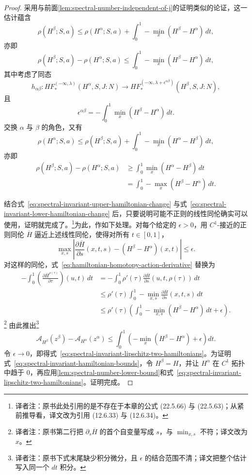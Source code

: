 \begin{proof}
采用与前面\cref{lem:spectral-number-independent-of-j}的证明类似的论证，这一估计蕴含
\[
  \rho(H^\beta;S,a)
  \le\rho(H^\alpha;S,a)
    +\int_0^1-\min_x(H^\beta-H^\alpha)\,dt,
\]
亦即
\begin{equation}
  \rho(H^\beta;S,a)-\rho(H^\alpha;S,a)
  \le\int_0^1-\min_x(H^\beta-H^\alpha)\,dt,
\label{eq:spectral-invariant-upper-hamiltonian-change}
\end{equation}
其中考虑了同态
\[
  h_{\alpha\beta}:
  HF_*^{(-\infty,\lambda)}(H^\alpha,S,J:N)
  \longrightarrow
  HF_*^{(-\infty,\lambda+\epsilon^{\alpha\beta})}(H^\beta,S,J:N),
\]
且
\[
  \epsilon^{\alpha\beta}
  =-\int_0^1\min_x(H^\beta-H^\alpha)\,dt.
\]
交换 $\alpha$ 与 $\beta$ 的角色，又有
\[
  \rho(H^\alpha;S,a)
  \le\rho(H^\beta;S,a)
    +\int_0^1-\min_x(H^\alpha-H^\beta)\,dt,
\]
亦即
\begin{equation}
\begin{split}
  \rho(H^\beta;S,a)-\rho(H^\alpha;S,a)
  &\ge\int_0^1\min_x(H^\alpha-H^\beta)\,dt\\
  &=\int_0^1-\max_x(H^\beta-H^\alpha)\,dt.
\end{split}
\label{eq:spectral-invariant-lower-hamiltonian-change}
\end{equation}

结合式~\eqref{eq:spectral-invariant-upper-hamiltonian-change} 与式~\eqref{eq:spectral-invariant-lower-hamiltonian-change} 后，只要说明可能不正则的线性同伦确实可以使用，证明就完成了。\footnote{译者注：原书此处引用的是不存在于本章的公式 (22.5.66) 与 (22.5.63)；从紧前推导看，译文改为引用 (12.6.33) 与 (12.6.34)。}为此，作如下处理。对每个给定的 $\epsilon>0$，用 $C^1$-接近的正则同伦 $\overline H$ 逼近上述线性同伦，使得对所有 $t\in[0,1]$，
\[
  \max_{x,s}
  \left\lvert
    \frac{\partial\overline H}{\partial s}(x,t,s)
    -(H^\beta-H^\alpha)(x,t)
  \right\rvert
  \le\epsilon.
\]
对这样的同伦，式~\eqref{eq:hamiltonian-homotopy-action-derivative} 替换为
\[
\begin{split}
  -\int_0^1
  \left(\frac{\partial\overline H^{\rho(\tau)}}{\partial\tau}\right)(u,t)\,dt
  &=-\int_0^1\rho'(\tau)
    \frac{\partial\overline H}{\partial s}(u,t,\rho(\tau))\,dt\\
  &\le\rho'(\tau)
    \int_0^1-\min_{x,s}
    \frac{\partial\overline H}{\partial s}(x,t,s)\,dt\\
  &\le\rho'(\tau)
    \left(
      \int_0^1-\min_{x,s}(H^\beta-H^\alpha)\,dt
      +\epsilon
    \right).
\end{split}
\]
\footnote{译者注：原书第二行把 $\partial_s\overline H$ 的首个自变量写成 $s$，与 $\min_{x,s}$ 不符；译文改为 $x$。}
由此推出\footnote{译者注：原书下式末尾缺少积分微分，且 $\epsilon$ 的结合范围不清；译文把整个估计写入同一个 $dt$ 积分。}
\[
  \mathcal A_{H^\beta}(z^\beta)-\mathcal A_{H^\alpha}(z^\alpha)
  \le\int_0^1
  \left(-\min_x(H^\beta-H^\alpha)+\epsilon\right)dt.
\]
令 $\epsilon\to0$，即得式~\eqref{eq:spectral-invariant-lipschitz-two-hamiltonians}。为证明式~\eqref{eq:spectral-invariant-hamiltonian-bounds}，令 $H^\beta=H$，并让 $H^\alpha$ 在 $C^1$ 拓扑中趋于 0，再应用\cref{lem:spectral-number-lower-bound}和式~\eqref{eq:spectral-invariant-lipschitz-two-hamiltonians}。证明完成。
\end{proof}

